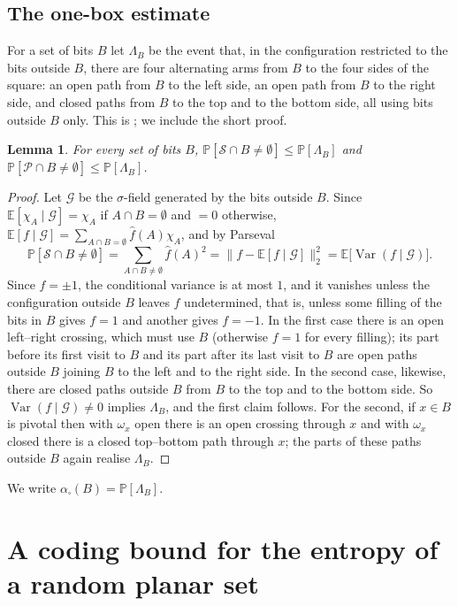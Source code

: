 \documentclass[11pt]{amsart}
\newtheorem{lemma}[theorem]{Lemma}
\theoremstyle{remark}
\newcommand{\PP}{\mathbb{P}}
\newcommand{\EE}{\mathbb{E}}
\newcommand{\Sc}{\mathcal{S}}
\newcommand{\Pc}{\mathcal{P}}
\newcommand{\Var}{\operatorname{Var}}
\begin{document}
\subsection{The one-box estimate}
For a set of bits $B$ let $\Lambda_B$ be the event that, in the configuration restricted to the bits outside $B$, there are four alternating arms from $B$ to the four sides of the square: an open path from $B$ to the left side, an open path from $B$ to the right side, and closed paths from $B$ to the top and to the bottom side, all using bits outside $B$ only. This is \cite[Lemma~3.2]{GPS10}; we include the short proof.

\begin{lemma}\label{lem:onebox}
For every set of bits $B$, $\PP[\Sc\cap B\ne\emptyset]\le\PP[\Lambda_B]$ and $\PP[\Pc\cap B\ne\emptyset]\le\PP[\Lambda_B]$.
\end{lemma}

\begin{proof}
Let $\mathcal G$ be the $\sigma$-field generated by the bits outside $B$. Since $\EE[\chi_A\mid\mathcal G]=\chi_A$ if $A\cap B=\emptyset$ and $=0$ otherwise, $\EE[f\mid\mathcal G]=\sum_{A\cap B=\emptyset}\hat f(A)\chi_A$, and by Parseval
\[
\PP[\Sc\cap B\ne\emptyset]=\sum_{A\cap B\ne\emptyset}\hat f(A)^2=\big\|f-\EE[f\mid\mathcal G]\big\|_2^2=\EE\big[\Var(f\mid\mathcal G)\big].
\]
Since $f=\pm1$, the conditional variance is at most $1$, and it vanishes unless the configuration outside $B$ leaves $f$ undetermined, that is, unless some filling of the bits in $B$ gives $f=1$ and another gives $f=-1$. In the first case there is an open left--right crossing, which must use $B$ (otherwise $f=1$ for every filling); its part before its first visit to $B$ and its part after its last visit to $B$ are open paths outside $B$ joining $B$ to the left and to the right side. In the second case, likewise, there are closed paths outside $B$ from $B$ to the top and to the bottom side. So $\Var(f\mid\mathcal G)\ne0$ implies $\Lambda_B$, and the first claim follows. For the second, if $x\in B$ is pivotal then with $\omega_x$ open there is an open crossing through $x$ and with $\omega_x$ closed there is a closed top--bottom path through $x$; the parts of these paths outside $B$ again realise $\Lambda_B$.
\end{proof}

We write $\alpha_\square(B)=\PP[\Lambda_B]$.

\section{A coding bound for the entropy of a random planar set}\label{sec:coding}
\end{document}
